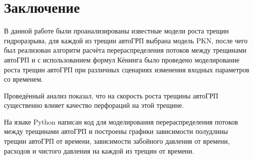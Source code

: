 \chapter*{Заключение} \label{ch-conclusion}

В данной работе были проанализированы известные модели роста трещин гидроразрыва, для каждой из трещин автоГРП выбрана модель PKN, после чего был реализован алгоритм расчёта перераспределения потоков между трещинами автоГРП и с использованием формул Кёнинга было проведено моделирование роста трещин автоГРП при различных сценариях изменения входных параметров со временем.

Проведённый анализ показал, что на скорость роста трещины автоГРП существенно влияет качество перфораций на этой трещине.

На языке Python написан код для моделирования перераспределения потоков между трещинами автоГРП и построены графики зависимости полудлины трещин автоГРП от времени, зависимости забойного давления от времени, расходов и чистого давления на каждой из трещин от времени.
